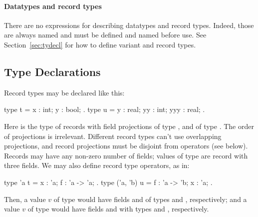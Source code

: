 \paragraph{Datatypes and record types}

There are no expressions for describing datatypes and record types. Indeed,
those are always named and must be defined and named before use. See
Section~\ref{sec:tydecl} for how to define variant and record types.

\subsection{Type Declarations}

Record types may be declared like this:
\begin{easycrypt}{}{}
type t = { x : int; y : bool; }.
type u = { y : real; yy : int; yyy : real; }.
\end{easycrypt}
Here  is the type of records with field projections  of
type , and  of type . The order of projections
is irrelevant.  Different record types can't use overlapping
projections, and record projections must be disjoint from operators
(see below). Records may have any non-zero number of fields; values of
type  are record with three fields. We may also define record
type operators, as in:
\begin{easycrypt}{}{}
type 'a t = { x : 'a; f : 'a -> 'a; }.
type ('a, 'b) u = { f : 'a -> 'b; x : 'a; }.
\end{easycrypt}
Then, a value $v$ of type  would have fields  and
 of types  and , respectively; and
a value $v$ of type  would have fields  and
 with types  and , respectively.


